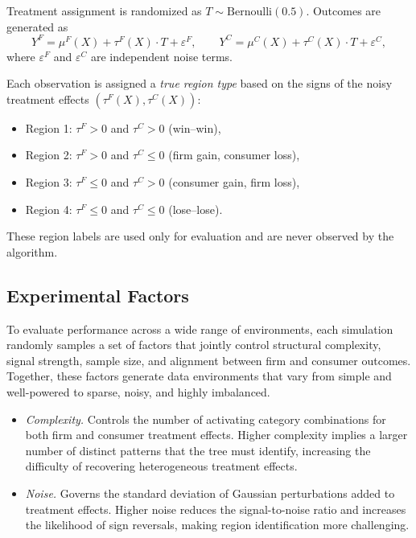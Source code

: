 \documentclass[11pt,letterpaper,english]{article}
\theoremstyle{definition}
\theoremstyle{definition}
\begin{document}
\begin{bibunit}
Treatment assignment is randomized as $T \sim \mathrm{Bernoulli}(0.5)$. Outcomes are generated as
\[
Y^F = \mu^F(X) + \tau^F(X) \cdot T + \varepsilon^F, \qquad
Y^C = \mu^C(X) + \tau^C(X) \cdot T + \varepsilon^C,
\]
where $\varepsilon^F$ and $\varepsilon^C$ are independent noise terms.

Each observation is assigned a \emph{true region type} based on the signs of the noisy treatment effects $(\tau^F(X), \tau^C(X))$:
\begin{itemize}
    \item Region 1: $\tau^F > 0$ and $\tau^C > 0$ (win--win),
    \item Region 2: $\tau^F > 0$ and $\tau^C \leq 0$ (firm gain, consumer loss),
    \item Region 3: $\tau^F \leq 0$ and $\tau^C > 0$ (consumer gain, firm loss),
    \item Region 4: $\tau^F \leq 0$ and $\tau^C \leq 0$ (lose--lose).
\end{itemize}

These region labels are used only for evaluation and are never observed by the algorithm.

\subsection{Experimental Factors}
\label{sec:binary-factors}

To evaluate performance across a wide range of environments, each simulation randomly samples a set of factors that jointly control structural complexity, signal strength, sample size, and alignment between firm and consumer outcomes. Together, these factors generate data environments that vary from simple and well-powered to sparse, noisy, and highly imbalanced.

\begin{itemize}
    \item \emph{Complexity.}  
    Controls the number of activating category combinations for both firm and consumer treatment effects. Higher complexity implies a larger number of distinct patterns that the tree must identify, increasing the difficulty of recovering heterogeneous treatment effects.

    \item \emph{Noise.}  
    Governs the standard deviation of Gaussian perturbations added to treatment effects. Higher noise reduces the signal-to-noise ratio and increases the likelihood of sign reversals, making region identification more challenging.


\end{itemize}
\end{bibunit}
\end{document}
